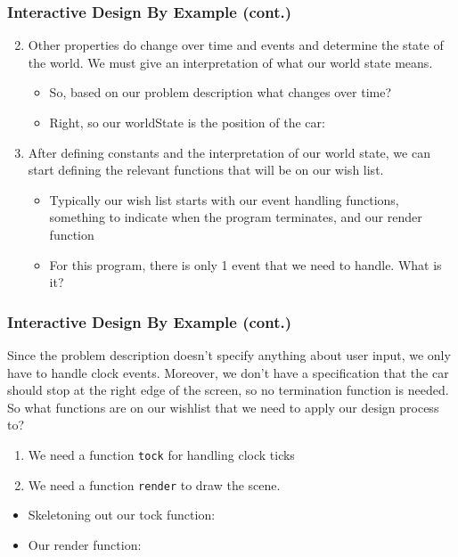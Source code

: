 \documentclass{beamer}
\begin{document}
\begin{frame}
  \frametitle{Interactive Design By Example (cont.)}
  \begin{enumerate}
    \setcounter{enumi}{1}
  \item<1-> Other properties do change over time and events and determine the state of the world. We must give an interpretation of what our world state means.
    \begin{itemize}
    \item<2-> So, based on our problem description what changes over time?
    \item<3-> Right, so our worldState is the position of the car:
      \worldState
    \end{itemize}
  \item<4-> After defining constants and the interpretation of our world state,
    we can start defining the relevant functions that will be on our wish list.
    \begin{itemize}
    \item<5-> Typically our wish list starts with our event handling functions, something to indicate when the program terminates, and our render function
    \item<6-> For this program, there is only 1 event that we need to handle. What is it?
    \end{itemize}
  \end{enumerate}
\end{frame}



\begin{frame}
  \frametitle{Interactive Design By Example (cont.)}
  Since the problem description doesn't specify anything about user
  input, we only have to handle clock events. Moreover, we don't have a specification that the car should stop at the right edge of the screen, so no termination function is needed. So what functions are on our wishlist that we need to apply our design process to?
  \begin{enumerate}
  \item<2-> We need a function \texttt{tock} for handling clock ticks
  \item<3-> We need a function \texttt{render} to draw the scene.
  \end{enumerate}
  \begin{itemize}
  \item<4-> Skeletoning out our tock function:
    \tock
  \item<5-> Our render function:
    \render
  \end{itemize}
\end{frame}
\end{document}
